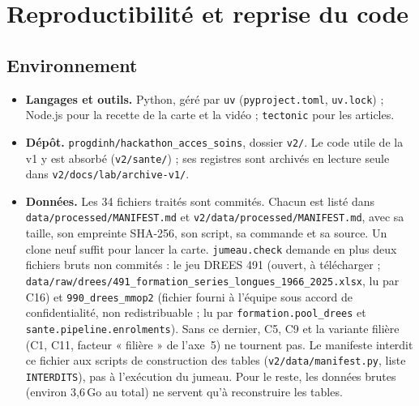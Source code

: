 \section{Reproductibilité et reprise du code}\label{sec:repro-ref}

\subsection{Environnement}
\begin{itemize}
\item \textbf{Langages et outils.} Python, géré par \texttt{uv} (\texttt{pyproject.toml}, \texttt{uv.lock}) ;
  Node.js pour la recette de la carte et la vidéo ; \texttt{tectonic} pour les articles.
\item \textbf{Dépôt.} \texttt{progdinh/hackathon\_acces\_soins}, dossier \texttt{v2/}. Le code utile de la v1 y
  est absorbé (\texttt{v2/sante/}) ; ses registres sont archivés en lecture seule dans
  \texttt{v2/docs/lab/archive-v1/}.
\item \textbf{Données.} Les 34 fichiers traités sont commités. Chacun est listé dans
  \texttt{data/processed/MANIFEST.md} et \texttt{v2/data/processed/MANIFEST.md}, avec sa taille, son empreinte
  SHA-256, son script, sa commande et sa source. Un clone neuf suffit pour lancer la carte. \texttt{jumeau.check} demande en plus deux
  fichiers bruts non commités : le jeu DREES 491 (ouvert, à télécharger ;
  \texttt{data/raw/drees/491\_formation\_series\_longues\_1966\_2025.xlsx}, lu par C16) et
  \texttt{990\_drees\_mmop2} (fichier fourni à l'équipe sous accord de confidentialité, non redistribuable ; lu par
  \texttt{formation.pool\_drees} et \texttt{sante.pipeline.enrolments}). Sans ce dernier, C5, C9 et la variante
  filière (C1, C11, facteur « filière » de l'axe~5) ne tournent pas. Le manifeste interdit ce fichier aux scripts
  de construction des tables (\texttt{v2/data/manifest.py}, liste \texttt{INTERDITS}), pas à l'exécution du
  jumeau. Pour le reste, les données brutes (environ 3,6\,Go\mesure{} au total) ne servent qu'à reconstruire les
  tables.
\end{itemize}

